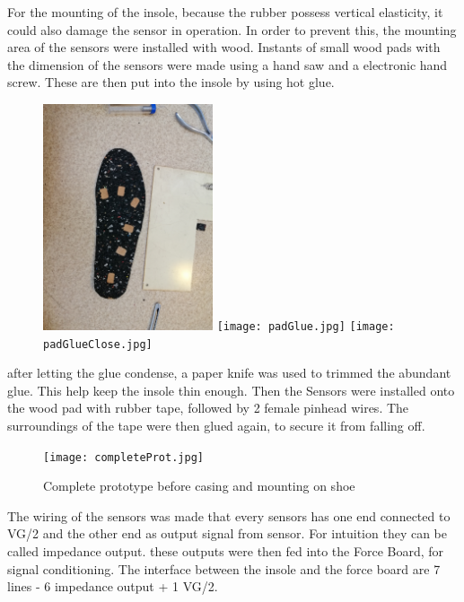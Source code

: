 \documentclass[12 pt, a4paper]{thesis}
\begin{document}
For the mounting of the insole, because the rubber possess vertical elasticity, it could also damage the sensor in operation. In order to prevent this, the mounting area of the sensors were installed with wood. Instants of small wood pads with the dimension of the sensors were made using a hand saw and a electronic hand screw. These are then put into the insole by using hot glue.\\
\begin{figure}[hbt!]
\begin{center}
\includegraphics[width=50mm]{padPos.jpg}
\hfill
\texttt{[image: padGlue.jpg]}
\hfill
\texttt{[image: padGlueClose.jpg]}
\end{center}
\end{figure}
after letting the glue condense, a paper knife was used to trimmed the abundant glue. This help keep the insole thin enough. Then the Sensors were installed onto the wood pad with rubber tape, followed by 2 female pinhead wires. The surroundings of the tape were then glued again, to secure it from falling off.\\
\begin{figure}[hbt!]
\begin{center}
\texttt{[image: completeProt.jpg]}
\caption{Complete prototype before casing and mounting on shoe}
\end{center}
\end{figure}
The wiring of the sensors was made that every sensors has one end connected to VG/2 and the other end as output signal from sensor. For intuition they can be called impedance output. these outputs were then fed into the Force Board, for signal conditioning. The interface between the insole and the force board are 7 lines - 6 impedance output + 1 VG/2.
\end{document}

